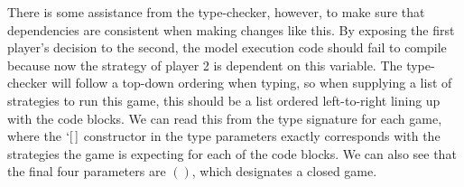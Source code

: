 \documentclass[11pt,titlepage,dvipsnames,table,xcdraw,english]{article}
\newcommand{\Conid}[1]{\mathit{#1}}
\newcommand{\Varid}[1]{\mathit{#1}}
\def\resethooks{%
  \global\let\SaveRestoreHook\empty
  \global\let\ColumnHook\empty}
\newcommand{\hsindent}[1]{\quad}%
\let\hspre\empty
\let\hspost\empty
\renewcommand{\Conid}[1]{{\color{funcColor}{#1}}}
\renewcommand{\Varid}[1]{{\color{typeColor}{#1}}}
\begin{document}
There is some assistance from the type-checker, however, to make sure that dependencies are consistent when making changes like this. By exposing the first player's decision to the second, the model execution code should fail to compile because now the strategy of player 2 is dependent on this variable. The type-checker will follow a top-down ordering when typing, so when supplying a list of strategies to run this game, this should be a list ordered left-to-right lining up with the code blocks. We can read this from the type signature for each game, where the \ensuremath{`[\mskip1.5mu \mskip1.5mu]} constructor in the type parameters exactly corresponds with the strategies the game is expecting for each of the code blocks. We can also see that the final four parameters are \ensuremath{()}, which designates a closed game. 
\begin{minipage}\textwidth
{}\resethooks
   
\end{minipage}
\end{document}
